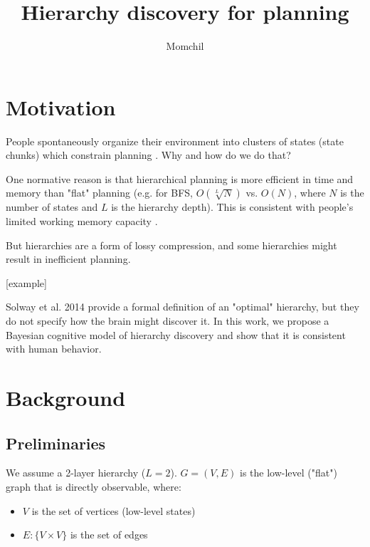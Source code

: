 \documentclass[11pt]{article}
\title{Hierarchy discovery for planning}
\author{Momchil}
\begin{document}
\maketitle




\section{Motivation}

People spontaneously organize their environment into clusters of states (state chunks) which constrain planning \cite{Solway2014, Schapiro2013, balaguer2016neural}. Why and how do we do that?

One normative reason is that hierarchical planning is more efficient in time and memory than "flat" planning \cite{fernandez2013multi} (e.g. for BFS, $O(\sqrt[L]{N})$ vs. $O(N)$, where $N$ is the number of states and $L$ is the hierarchy depth). This is consistent with people's limited working memory capacity \cite{miller1956magic}.

But hierarchies are a form of lossy compression, and some hierarchies might result in inefficient planning.

[example]

Solway et al. 2014 \cite{Solway2014} provide a formal definition of an "optimal" hierarchy, but they do not specify how the brain might discover it. In this work, we propose a Bayesian cognitive model of hierarchy discovery and show that it is consistent with human behavior.

\section{Background}

\subsection{Preliminaries}

We assume a 2-layer hierarchy ($L = 2$). $G = (V,E)$ is the low-level ("flat") graph that is directly observable, where:

\begin{itemize}
    \item $V$ is the set of vertices (low-level states)
    \item $E: \{V \times V\}$ is the set of edges
\end{itemize}
\end{document}

